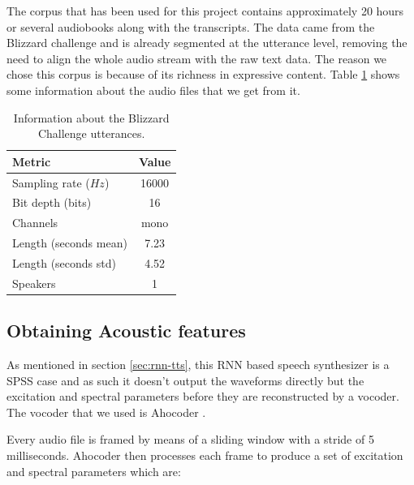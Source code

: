 The corpus that has been used for this project contains approximately 20 hours or several audiobooks along with the transcripts. The data came from the Blizzard challenge \cite{blizzard} and is already segmented at the utterance level, removing the need to align the whole audio stream with the raw text data. The reason we chose this corpus is because of its richness in expressive content. Table \ref{tab:blizard} shows some information about the audio files that we get from it.

\begin{table}[h]
    \centering
    \begin{tabular}{l|c}
        Metric & Value \\
        \hline
        Sampling rate ($Hz$) & 16000 \\
        Bit depth (bits) & 16 \\
        Channels & mono \\
        Length (seconds mean) & 7.23 \\
        Length (seconds std) & 4.52 \\
        Speakers & 1
    \end{tabular}
    \caption{Information about the Blizzard Challenge utterances.}
    \label{tab:blizard}
\end{table}


\subsection{Obtaining Acoustic features} \label{sec:aco-features}

As mentioned in section \ref{sec:rnn-tts}, this RNN based speech synthesizer is a SPSS case and as such it doesn't output the waveforms directly but the excitation and spectral parameters before they are reconstructed by a vocoder. The vocoder that we used is Ahocoder \cite{vocoder_ah}.

Every audio file is framed by means of a sliding window with a stride of 5 milliseconds. Ahocoder then processes each frame to produce a set of excitation and spectral parameters which are:

